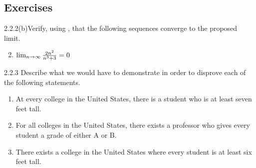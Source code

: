 \subsection{Exercises}

\begin{exercise}
    {2.2.2(b)}Verify, using , that
    the following sequences converge to the proposed limit.
    \begin{enumerate}
        \setcounter{enumi}{1}
        \item \(\lim_{n \rightarrow \infty}\frac{2n^2}{n^3+3} = 0\)
    \end{enumerate}
\end{exercise}


\begin{exercise}
    {2.2.3} Describe what we would have to demonstrate in order to disprove each of the following statements.
    \begin{enumerate}
        \item At every college in the United States, there is a student who is at least
              seven feet tall.
        \item For all colleges in the United States, there exists a professor who gives every student a grade of either A or B.
        \item There exists a college in the United States where every student is at least six feet tall.
    \end{enumerate}
\end{exercise}

